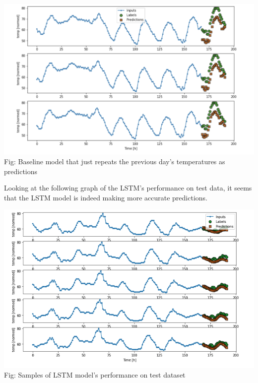 \documentclass[paper=a4, fontsize=11pt, margin=1in]{scrartcl}
\numberwithin{equation}{section}		%
\numberwithin{figure}{section}			%
\numberwithin{table}{section}				%
\begin{document}
\begin{center}
\includegraphics[width=1\textwidth]{base-2.png}\\
Fig: Baseline model that just repeats the previous day's temperatures as predictions 
\end{center}

\pagebreak
Looking at the following graph of the LSTM's performance on test data, it seems that the LSTM model is indeed making more accurate predictions.\\
\begin{center}
    \includegraphics[scale=0.6]{model-eval.png}\\
    Fig: Samples of LSTM model's performance on test dataset\\
\end{center}
\end{document}
